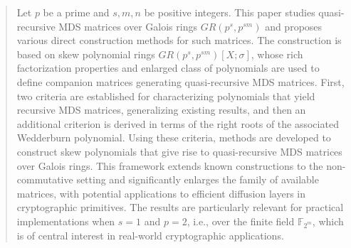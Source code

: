 \documentclass[11pt]{article}
\begin{document}
\begin{abstract}


Let $p$ be a prime and $s,m,n$ be positive integers. This paper studies quasi-recursive MDS matrices over Galois rings $GR(p^{s}, p^{sm})$ and proposes various direct construction methods for such matrices. The construction is based on skew polynomial rings $GR(p^{s}, p^{sm})[X;\sigma]$, whose rich factorization properties and enlarged class of polynomials are used to define companion matrices generating quasi-recursive MDS matrices. First, two criteria are established for characterizing polynomials that yield recursive MDS matrices, generalizing existing results, and then an additional criterion is derived in terms of the right roots of the associated Wedderburn polynomial. Using these criteria, methods are developed to construct skew polynomials that give rise to quasi-recursive MDS matrices over Galois rings. This framework extends known constructions to the non-commutative setting and significantly enlarges the family of available matrices, with potential applications to efficient diffusion layers in cryptographic primitives. The results are particularly relevant for practical implementations when $s = 1$ and $p = 2$, i.e., over the finite field $\mathbb{F}_{2^m}$, which is of central interest in real-world cryptographic applications.

\end{abstract}
\end{document}
